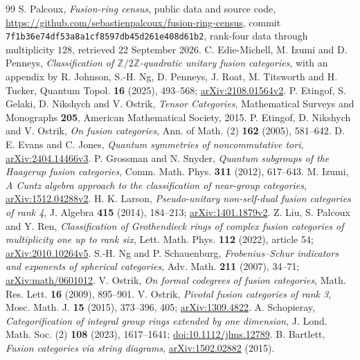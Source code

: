 \begin{thebibliography}{99}
 S. Palcoux,
\emph{Fusion-ring census}, public data and source code,
\url{https://github.com/sebastienpalcoux/fusion-ring-census},
commit \texttt{7f1b36e74df53a8a1cf8597db45d261e408d61b2},
rank-four data through multiplicity $128$, retrieved 22 September 2026.
 C. Edie-Michell, M. Izumi and D. Penneys,
\emph{Classification of $\mathbb Z/2\mathbb Z$-quadratic unitary fusion categories},
with an appendix by R. Johnson, S.-H. Ng, D. Penneys, J. Roat, M. Titsworth and H. Tucker,
Quantum Topol. \textbf{16} (2025), 493--568;
\href{https://arxiv.org/abs/2108.01564v2}{arXiv:2108.01564v2}.
 P. Etingof, S. Gelaki, D. Nikshych and V. Ostrik,
\emph{Tensor Categories}, Mathematical Surveys and Monographs \textbf{205},
American Mathematical Society, 2015.
 P. Etingof, D. Nikshych and V. Ostrik,
\emph{On fusion categories}, Ann. of Math. (2) \textbf{162} (2005), 581--642.
 D. E. Evans and C. Jones,
\emph{Quantum symmetries of noncommutative tori},
\href{https://arxiv.org/abs/2404.14466v3}{arXiv:2404.14466v3}.
 P. Grossman and N. Snyder,
\emph{Quantum subgroups of the Haagerup fusion categories},
Comm. Math. Phys. \textbf{311} (2012), 617--643.
 M. Izumi,
\emph{A Cuntz algebra approach to the classification of near-group categories},
\href{https://arxiv.org/abs/1512.04288v2}{arXiv:1512.04288v2}.
 H. K. Larson,
\emph{Pseudo-unitary non-self-dual fusion categories of rank 4},
J. Algebra \textbf{415} (2014), 184--213;
\href{https://arxiv.org/abs/1401.1879v2}{arXiv:1401.1879v2}.
 Z. Liu, S. Palcoux and Y. Ren,
\emph{Classification of Grothendieck rings of complex fusion categories of
multiplicity one up to rank six}, Lett. Math. Phys. \textbf{112} (2022), article 54;
\href{https://arxiv.org/abs/2010.10264v5}{arXiv:2010.10264v5}.
 S.-H. Ng and P. Schauenburg,
\emph{Frobenius--Schur indicators and exponents of spherical categories},
Adv. Math. \textbf{211} (2007), 34--71;
\href{https://arxiv.org/abs/math/0601012}{arXiv:math/0601012}.
 V. Ostrik,
\emph{On formal codegrees of fusion categories}, Math. Res. Lett. \textbf{16}
(2009), 895--901.
 V. Ostrik,
\emph{Pivotal fusion categories of rank 3}, Mosc. Math. J. \textbf{15} (2015),
373--396, 405; \href{https://arxiv.org/abs/1309.4822}{arXiv:1309.4822}.
 A. Schopieray,
\emph{Categorification of integral group rings extended by one dimension},
J. Lond. Math. Soc. (2) \textbf{108} (2023), 1617--1641;
\href{https://doi.org/10.1112/jlms.12789}{doi:10.1112/jlms.12789}.
 B. Bartlett,
\emph{Fusion categories via string diagrams},
\href{https://arxiv.org/abs/1502.02882}{arXiv:1502.02882} (2015).
\end{thebibliography}
